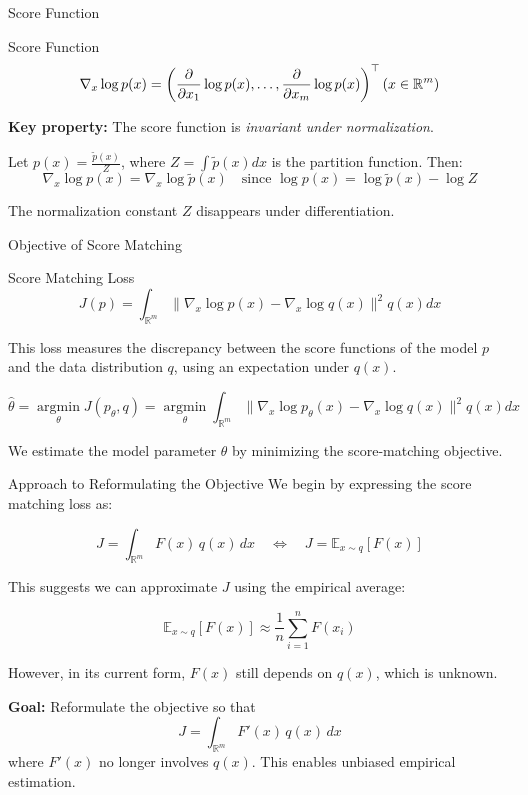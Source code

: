\documentclass[aspectratio=169]{beamer}
\begin{document}
\begin{frame}{Score Function}
\begin{block}{Score Function}
\[
\nabla_x \log p(x) = \left(
\frac{\partial}{\partial x_1}\log p(x), \dots,
\frac{\partial}{\partial x_m}\log p(x)
\right)^\top \left(\space x\in \mathbb{R}^m\right)  
\]
\end{block}
\vspace{0.5em}
\textbf{Key property:} The score function is \emph{invariant under normalization}.

\vspace{0.5em}
Let \( p(x) = \frac{\tilde{p}(x)}{Z} \), where \( Z = \int \tilde{p}(x) dx \) is the partition function. Then:
$$
\nabla_x \log p(x) = \nabla_x \log \tilde{p}(x)\quad \text{since } \log p(x) = \log \tilde{p}(x) - \log Z
$$

\vspace{0.5em}
The normalization constant \( Z \) disappears under differentiation.

\end{frame}
\begin{frame}{Objective of Score Matching}

\begin{block}{Score Matching Loss}
$$
 J(p) = \int_{\mathbb{R}^m}\|\nabla_x \log p(x) - \nabla_x\log q(x)\|^2 q(x)dx
$$
\end{block}

\vspace{1em}
This loss measures the discrepancy between the score functions of the model \( p \) and the data distribution \( q \), 
using an expectation under  \( q(x) \).

\[
\hat{\theta} = \operatorname*{argmin}_{\theta} J(p_{\theta}, q) 
= \operatorname*{argmin}_{\theta}\int_{\mathbb{R}^m}
\|\nabla_x \log p_\theta(x) - \nabla_x\log q(x)\|^2 q(x)dx
\]

\vspace{1em}
We estimate the model parameter \( \theta \) by minimizing the score-matching objective.

\end{frame}
\begin{frame}{Approach to Reformulating the Objective}
    We begin by expressing the score matching loss as:

\[
J = \int_{\mathbb{R}^m} F(x) \, q(x) \, dx \quad \Longleftrightarrow \quad J = \mathbb{E}_{x \sim q}[F(x)]
\]

\vspace{1em}

This suggests we can approximate \( J \) using the empirical average:

\[
\mathbb{E}_{x \sim q}[F(x)] \approx \frac{1}{n} \sum_{i=1}^n F(x_i)
\]

\vspace{1em}

However, in its current form, \( F(x) \) still depends on \( q(x) \), which is unknown.

\textbf{Goal:} Reformulate the objective so that
\[
J = \int_{\mathbb{R}^m} F'(x) \, q(x) \, dx
\]
where \( F'(x) \) no longer involves \( q(x) \). This enables unbiased empirical estimation.
\end{frame}
\end{document}

